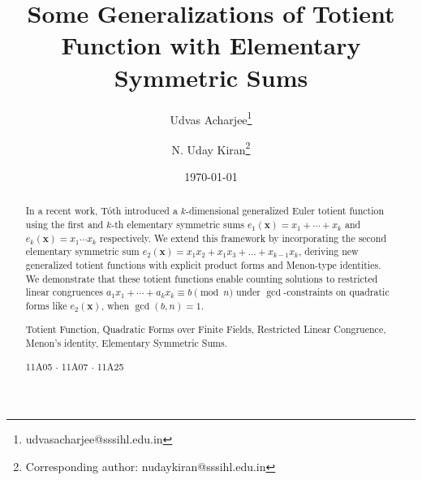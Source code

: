 \documentclass[12pt]{article}
\providecommand{\keywords}[1]
{
	\small	
	\textbf{\text{Keywords:}} #1
}
\providecommand{\subclass}[1]
{
	\small	
	\textbf{\text{MSC(2020):}} #1
}
\begin{document}
\title{Some Generalizations of Totient Function with Elementary Symmetric Sums}
    \author[1]{Udvas Acharjee\thanks{udvasacharjee@sssihl.edu.in}}
\author[1]{N. Uday Kiran\thanks{Corresponding author: nudaykiran@sssihl.edu.in}}

	\date{\today}
    \maketitle
\begin{abstract}

In a recent work, T\'oth introduced a $k$-dimensional generalized Euler totient function using the first and $k$-th elementary symmetric sums $e_1(\mathbf{x}) = x_1 + \cdots + x_k$ and $e_k(\mathbf{x}) = x_1 \cdots x_k$ respectively. We extend this framework by incorporating the second elementary symmetric sum $e_2(\mathbf{x}) = x_1x_2+x_1x_3+\dots+x_{k-1}x_k$, deriving new generalized totient functions with explicit product forms and Menon-type identities. We demonstrate that these totient functions enable counting solutions to restricted linear congruences $a_1 x_1 + \cdots + a_k x_k \equiv b \pmod{n}$ under $\gcd$-constraints on quadratic forms like $e_2(\mathbf{x})$, when $\gcd(b,n)=1$.
 
   \keywords{ Totient Function, Quadratic Forms over Finite Fields, Restricted Linear Congruence, Menon's identity, Elementary Symmetric Sums.}

   \subclass{11A05 $\cdot$ 11A07 $\cdot$ 11A25}
\end{abstract}
 
\end{document}
